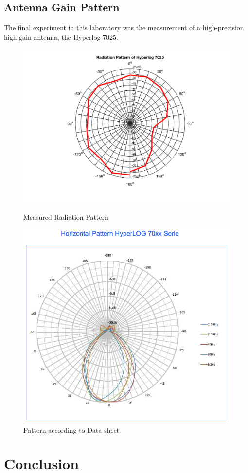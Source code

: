 \subsection{Antenna Gain Pattern}
The final experiment in this laboratory was the measurement of a high-precision high-gain antenna, the Hyperlog 7025.

\begin{figure}[h!]
    \centering
    \begin{minipage}{0.45\textwidth}
        \centering
		\includegraphics[width=\textwidth+6em]{images/hyperlog.png}
		\caption{Measured Radiation Pattern}
		\label{fig:hyper}
    \end{minipage}\hfill
    \begin{minipage}{0.45\textwidth}
		\includegraphics[width=\textwidth]{images/hyperlog_ds.png}
		\caption{Pattern according to Data sheet}
		\label{fig:hyper_sheet}
    \end{minipage}
\end{figure}


\section{Conclusion}